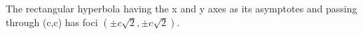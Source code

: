  The rectangular hyperbola having the x and y axes as its asymptotes and
passing through (c,c) has foci $ ( \pm c \sqrt{2} , \pm c \sqrt{2} ) . $
